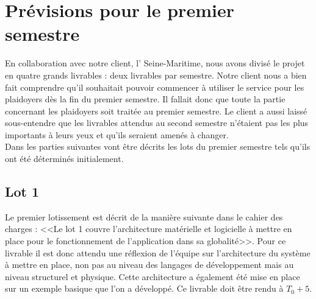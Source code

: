 \documentclass[asi]{picInsa}
\begin{document}
\section{Prévisions pour le premier semestre}
En collaboration avec notre client, l'\nomClient{} Seine-Maritime, nous avons divisé le projet en quatre grands livrables : deux livrables par semestre. Notre client nous a bien fait comprendre qu'il souhaitait pouvoir commencer à utiliser le service pour les plaidoyers dès la fin du premier semestre. Il fallait donc que toute la partie concernant les plaidoyers soit traitée au premier semestre. Le client a aussi laissé sous-entendre que les livrables attendus au second semestre n'étaient pas les plus importants à leurs yeux et qu'ils seraient amenés à changer.\vspace{0.5cm}\\
Dans les parties suivantes vont être décrits les lots du premier semestre tels qu'ils ont été déterminés initialement.

\subsection{Lot 1}
Le premier lotissement est décrit de la manière suivante dans le cahier des charges : <<Le lot 1 couvre l'architecture matérielle et logicielle à mettre en place pour le fonctionnement de l'application dans sa globalité>>. Pour ce livrable il est donc attendu une réflexion de l'équipe sur l'architecture du système à mettre en place, non pas au niveau des langages de développement mais au niveau structurel et physique. Cette architecture a également été mise en place sur un exemple basique que l'on a développé. Ce livrable doit être rendu à $T_{0}+5$. 
\end{document}
